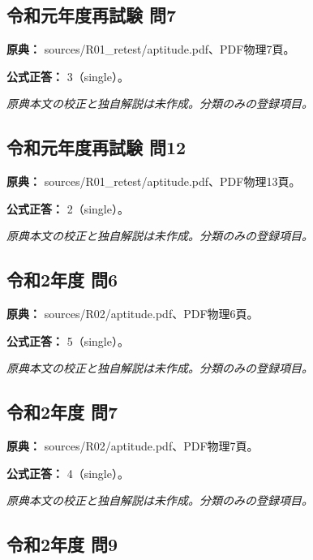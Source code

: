 \subsection{令和元年度再試験 問7}
\label{q:r01-ret-apt-07}

\noindent\textbf{原典：} sources/R01\_retest/aptitude.pdf、PDF物理7頁。

\textbf{公式正答：} 3（single）。

\par\textit{原典本文の校正と独自解説は未作成。分類のみの登録項目。}

\subsection{令和元年度再試験 問12}
\label{q:r01-ret-apt-12}

\noindent\textbf{原典：} sources/R01\_retest/aptitude.pdf、PDF物理13頁。

\textbf{公式正答：} 2（single）。

\par\textit{原典本文の校正と独自解説は未作成。分類のみの登録項目。}

\subsection{令和2年度 問6}
\label{q:r02-reg-apt-06}

\noindent\textbf{原典：} sources/R02/aptitude.pdf、PDF物理6頁。

\textbf{公式正答：} 5（single）。

\par\textit{原典本文の校正と独自解説は未作成。分類のみの登録項目。}

\subsection{令和2年度 問7}
\label{q:r02-reg-apt-07}

\noindent\textbf{原典：} sources/R02/aptitude.pdf、PDF物理7頁。

\textbf{公式正答：} 4（single）。

\par\textit{原典本文の校正と独自解説は未作成。分類のみの登録項目。}

\subsection{令和2年度 問9}
\label{q:r02-reg-apt-09}

